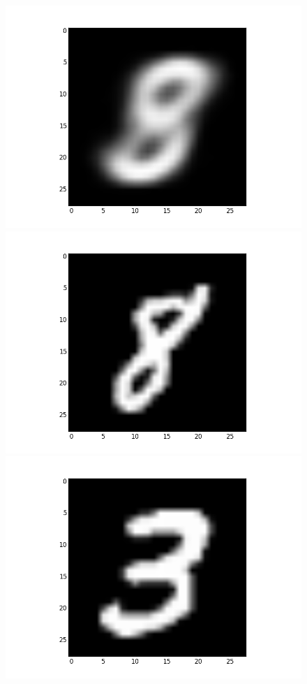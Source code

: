 \documentclass[submit]{harvardml}
\begin{document}
\begin{figure}[ht]
    \centering
    \includegraphics[scale=0.20]{mean-6}
    \includegraphics[scale=0.20]{representative-6-0}
    \includegraphics[scale=0.20]{representative-6-1}

\end{figure}
\end{document}
